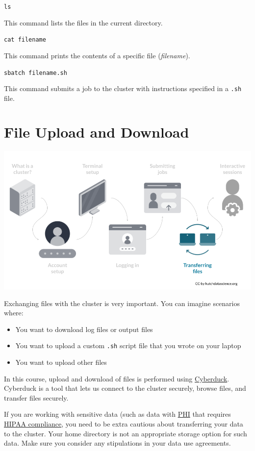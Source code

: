 \documentclass[
]{book}
\providecommand{\tightlist}{%
  \setlength{\itemsep}{0pt}\setlength{\parskip}{0pt}}
\begin{document}
\texttt{ls}

This command lists the files in the current directory.

\texttt{cat\ filename}

This command prints the contents of a specific file (\emph{filename}).

\texttt{sbatch\ filename.sh}

This command submits a job to the cluster with instructions specified in a \texttt{.sh} file.

\hypertarget{file-upload-and-download}{%
\chapter{File Upload and Download}\label{file-upload-and-download}}

\begin{center}\includegraphics[width=0.8\linewidth]{resources/images/06-upload-download_files/figure-latex//1BQxrVYdKZTbpCaF-i_q9w7s9x034lEXpQZDU-Sl09cs_gff2211b72f_1_252} \end{center}

Exchanging files with the cluster is very important. You can imagine scenarios where:

\begin{itemize}
\tightlist
\item
  You want to download log files or output files
\item
  You want to upload a custom \texttt{.sh} script file that you wrote on your laptop
\item
  You want to upload other files
\end{itemize}

In this course, upload and download of files is performed using \href{https://cyberduck.io/}{Cyberduck}. Cyberduck is a tool that lets us connect to the cluster securely, browse files, and transfer files securely.

If you are working with sensitive data (such as data with \href{https://www.hhs.gov/answers/hipaa/what-is-phi/index.html}{PHI} that requires \href{https://www.hhs.gov/hipaa/index.html}{HIPAA compliance}, you need to be extra cautious about transferring your data to the cluster. Your home directory is not an appropriate storage option for such data. Make sure you consider any stipulations in your data use agreements.
\end{document}
